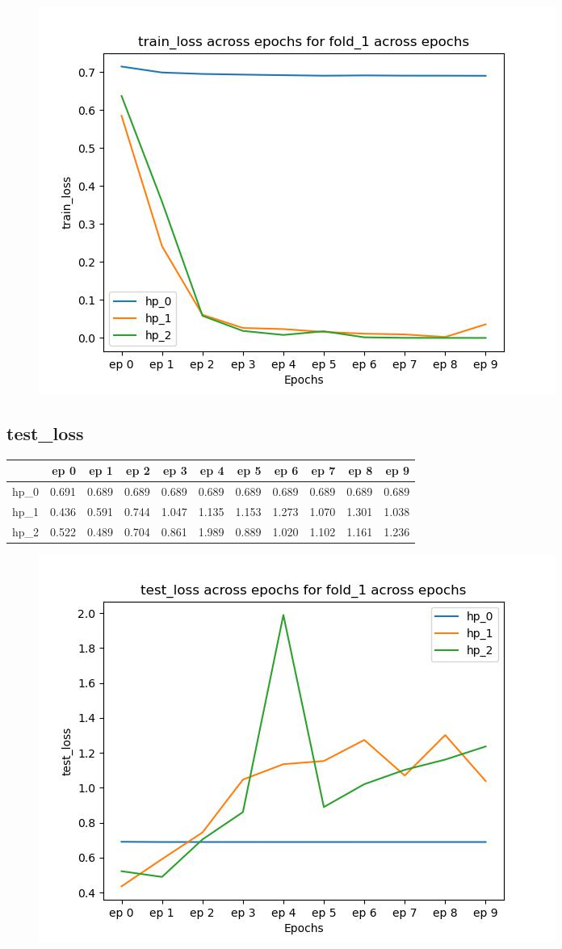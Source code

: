\documentclass{article}
\begin{document}
\begin{figure}[H]
\includegraphics[scale = 0.75]{fold_1/train_loss}
\end{figure}
\subsection{test\_loss}
\begin{tabular}{lrrrrrrrrrr}
\toprule
{} &   ep 0 &   ep 1 &   ep 2 &   ep 3 &   ep 4 &   ep 5 &   ep 6 &   ep 7 &   ep 8 &   ep 9 \\
\midrule
hp\_0 &  0.691 &  0.689 &  0.689 &  0.689 &  0.689 &  0.689 &  0.689 &  0.689 &  0.689 &  0.689 \\
hp\_1 &  0.436 &  0.591 &  0.744 &  1.047 &  1.135 &  1.153 &  1.273 &  1.070 &  1.301 &  1.038 \\
hp\_2 &  0.522 &  0.489 &  0.704 &  0.861 &  1.989 &  0.889 &  1.020 &  1.102 &  1.161 &  1.236 \\
\bottomrule
\end{tabular}

\begin{figure}[H]
\includegraphics[scale = 0.75]{fold_1/test_loss}
\end{figure}
\end{document}
